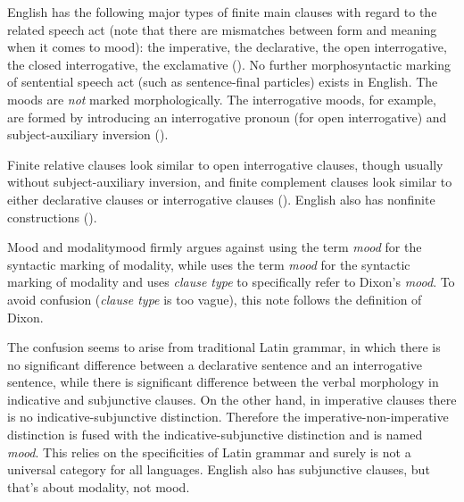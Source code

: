 \documentclass[UTF8, a4paper, oneside, scheme=plain]{ctexrep}
\newcommand*{\term}[1]{\emph{#1}}
\begin{document}
English has the following major types of finite main clauses with regard to the related speech act
(note that there are mismatches between form and meaning when it comes to mood):
the imperative, the declarative, 
the open interrogative, the closed interrogative,
the exclamative ().
No further morphosyntactic marking of sentential speech act (such as sentence-final particles)
exists in English.
The moods are \emph{not} marked morphologically.
The interrogative moods, for example, are formed by introducing an interrogative pronoun (for open interrogative)
and subject-auxiliary inversion (). 

Finite relative clauses look similar to open interrogative clauses,
though usually without subject-auxiliary inversion,
and finite complement clauses look similar to either declarative clauses or interrogative clauses 
().
English also has nonfinite constructions ().

\begin{infobox}{Mood and modality}{mood}
    \citet{dixon2009basic1} firmly argues against using the term \term{mood} 
    for the syntactic marking of modality,
    while \citet{cgel} uses the term \term{mood} for the syntactic marking of modality
    and uses \term{clause type} to specifically refer to Dixon's \term{mood}.
    To avoid confusion (\term{clause type} is too vague),
    this note follows the definition of Dixon.

    The confusion seems to arise from traditional Latin grammar,
    in which there is no significant difference 
    between a declarative sentence and an interrogative sentence, 
    while there is significant difference
    between the verbal morphology in indicative and subjunctive clauses.
    On the other hand, in imperative clauses 
    there is no indicative-subjunctive distinction.
    Therefore the imperative-non-imperative distinction is fused with 
    the indicative-subjunctive distinction 
    and is named \term{mood}.
    This relies on the specificities of Latin grammar 
    and surely is not a universal category for all languages.
    English also has subjunctive clauses,
    but that's about modality, not mood.
\end{infobox}
\end{document}
